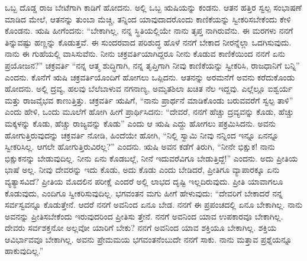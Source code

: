 ಒಬ್ಬ ದೊಡ್ಡ ರಾಜ ಬೇಟೆಗಾಗಿ ಕಾಡಿಗೆ ಹೋದನು. ಅಲ್ಲಿ ಒಬ್ಬ ಋಷಿಯನ್ನು ಕಂಡನು. ಆತನ ಹತ್ತಿರ ಸ್ವಲ್ಪ ಸಂಭಾಷಣೆ ಮಾಡಿದ ಮೇಲೆ, ಆತನನ್ನು ತುಂಬಾ ಮೆಚ್ಚಿ, ತನ್ನಿಂದ ಯಾವುದಾದರೊಂದು ಕಾಣಿಕೆಯನ್ನು ಸ್ವೀಕರಿಸಬೇಕೆಂದು ಕೇಳಿ ಕೊಂಡನು. ಋಷಿ ಹೀಗೆಂದನು: “ಬೇಕಾಗಿಲ್ಲ, ನನ್ನ ಸ್ಥಿತಿಯಲ್ಲಿಯೇ ನಾನು ತೃಪ್ತ ನಾಗಿರುವೆನು. ಈ ಮರಗಳು ನನಗೆ ತಿನ್ನುವಷ್ಟು ಹಣ್ಣನ್ನು ಕೊಡುತ್ತವೆ. ಈ ಸುಂದರವಾದ ಪರಿಶುದ್ಧ ಹೊಳೆ ನನಗೆ ಬೇಕಾದ ನೀರನ್ನೆಲ್ಲಾ ಒದಗಿಸುವುದು. ನಾನು ಈ ಗುಹೆಯಲ್ಲಿ ವಾಸಿಸುವೆನು. ನೀನು ಚಕ್ರವರ್ತಿಯಾಗಿದ್ದರೂ ನೀನು ಕೊಡುವ ಕಾಣಿಕೆಯಿಂದ ನನಗೆ ಏನು ಪ್ರಯೋಜನ?” ಚಕ್ರವರ್ತಿ “ನನ್ನ ಆತ್ಮ ಶುದ್ಧಿಗಾಗಿ, ನನ್ನ ತೃಪ್ತಿಗಾಗಿ ನೀವು ಕಾಣಿಕೆಯನ್ನು ಸ್ವೀಕರಿಸಿ, ರಾಜಧಾನಿಗೆ ಬನ್ನಿ” ಎಂದನು. ಕೊನೆಗೆ ಋಷಿ ಚಕ್ರವರ್ತಿಯೊಂದಿಗೆ ಹೋಗಲು ಒಪ್ಪಿದನು. ಆತನನ್ನು ಅರಮನೆಗೆ ಅವನು ಕರೆದುಕೊಂಡು ಹೋದನು. ಅಲ್ಲಿ ದ್ರವ್ಯ, ಹಲವು ಬೆಲೆಬಾಳುವ ನಗನಾಣ್ಯ, ಅಮೃತಶಿಲಾ ಖಚಿತ ನೆಲ ಇದ್ದವು. ಎಲ್ಲೆಲ್ಲೂ ಐಶ್ವರ್ಯ ಮತ್ತು ರಾಜವೈಭವ ಕಾಣುತ್ತಿತ್ತು. ಚಕ್ರವರ್ತಿ ಋಷಿಗೆ, “ನಾನು ಪ್ರಾರ್ಥನೆ ಮಾಡಿಕೊಂಡು ಬರುವವರೆಗೆ ಸ್ವಲ್ಪ ತಾಳಿ” ಎಂದು ಹೇಳಿ, ಒಂದು ಮೂಲೆಗೆ ಹೋಗಿ ಹೀಗೆ ಪ್ರಾರ್ಥಿಸಿದನು: “ದೇವರೆ, ನನಗೆ ಹೆಚ್ಚು ದ್ರವ್ಯವನ್ನು ಕೊಡು, ಹೆಚ್ಚು ಮಕ್ಕಳನ್ನು ಕೊಡು, ಹೆಚ್ಚು ರಾಜ್ಯವನ್ನು ಕೊಡು” ಎಂದು ಆ ಋಷಿ ಎದ್ದು ಹೋಗಲು ಪಕ್ರಮಿಸಿದನು. ಅವನು ಹೋಗುತ್ತಿರುವುದನ್ನು ಚಕ್ರವರ್ತಿ ನೋಡಿ, ಹಿಂದೆಯೇ ಹೋಗಿ, “ನಿಲ್ಲಿ ಸ್ವಾಮಿ ನೀವು ನನ್ನಿಂದ ಇನ್ನೂ ಏನನ್ನೂ ಸ್ವೀಕರಿಸಿಲ್ಲ. ಆಗಲೇ ಹೋಗುತ್ತಿರುವಿರಲ್ಲ?” ಎಂದನು. ಋಷಿ ಅವನ ಕಡೆಗೆ ತಿರುಗಿ, “ನೀನೇ ಭಿಕ್ಷುಕ! ನಾನು ಭಿಕ್ಷುಕನನ್ನು ಬೇಡುವುದಿಲ್ಲ. ನೀನು ಏನು ಕೊಡಬಲ್ಲೆ, ನೀನೆ ಇದುವರೆವಿಗೂ ಬೇಡುತ್ತಿದ್ದೆ!” ಎಂದನು. ಅದು ಪ್ರೀತಿಯ ಭಾಷೆ ಅಲ್ಲ. ನೀವು ದೇವರನ್ನು ಇದು ಕೊಡು, ಅದು ಕೊಡು ಎಂದು ಬೇಡಿದರೆ, ಪ್ರೀತಿಗೂ ವ್ಯಾಪಾರಕ್ಕೂ ಏನು ವ್ಯತ್ಯಾಸವಿದೆ? ಪ್ರೀತಿಯ ಮೊದಲಿನ ಪರೀಕ್ಷೆ ಎಂದರೆ ಅಲ್ಲಿ ಲಾಭದ ದೃಷ್ಟಿ ಇಲ್ಲದಿರುವುದು. ಪ್ರೀತಿ ಯಾವಾಗಲೂ ಕೊಡುವುದು, ಎಂದಿಗೂ ಸ್ವೀಕರಿಸುವುದಿಲ್ಲ. ಭಗವಂತನ ಮಗು ಹೀಗೆ ಹೇಳುವುದು: “ದೇವರಿಗೆ ಬೇಕಾದರೆ ನನ್ನ ಸರ್ವಸ್ವವನ್ನೂ ಕೊಡುತ್ತೇನೆ. ಆದರೆ ನನಗೆ ಅವನಿಂದ ಏನೂ ಬೇಡ. ನನಗೆ ಈ ಪ್ರಪಂಚದಲ್ಲಿ ಏನೂ ಬೇಕಾಗಿಲ್ಲ. ನಾನು ಅವನನ್ನು ಪ್ರೀತಿಸಬೇಕೆಂದು ಇರುವುದರಿಂದ ಪ್ರೀತಿಸು ತ್ತೇನೆ. ನನಗೆ ಅವನಿಂದ ಯಾವ ಉಪಕಾರವೂ ಬೇಕಾಗಿಲ್ಲ. ದೇವರು ಸರ್ವಶಕ್ತನೋ ಅಲ್ಲವೋ ಯಾರಿಗೆ ಬೇಕು? ನನಗೆ ಅವನಿಂದ ಯಾವ ಶಕ್ತಿಯೂ ಬೇಕಾಗಿಲ್ಲ. ಶಕ್ತಿಯ ಆವಿರ್ಭಾವವೂ ಬೇಕಾಗಿಲ್ಲ. ಅವನು ಪ್ರೇಮಮಯ ಭಗವಂತನೆಂಬುದೇ ನನಗೆ ಸಾಕು. ನಾನು ಮತ್ತಾವ ಪ್ರಶ್ನೆಯನ್ನೂ ಹಾಕುವುದಿಲ್ಲ.”

